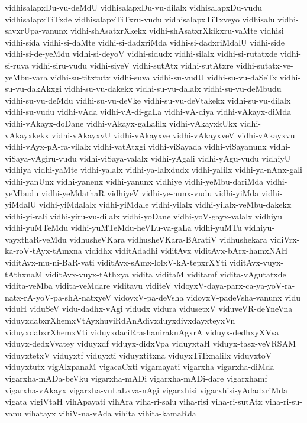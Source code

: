 {vidhisalapxDu-vu-deMdU
vidhisalapxDu-vu-dilalx
vidhisalapxDu-vudu
vidhisalapxTiTxde
vidhisalapxTiTxru-vudu
vidhisalapxTiTxveyo
vidhisalu
vidhi-savxrUpa-vanunx
vidhi-shAsatxrXkekx
vidhi-shAsatxrXkikxru-vaMte
vidhisi
vidhi-sida
vidhi-si-daMte
vidhi-si-dadxriMda
vidhi-si-dadxriMdalU
vidhi-side
vidhi-si-de-yeMdu
vidhi-si-deyoV
vidhi-sidudx
vidhi-silalx
vidhi-si-rutatxde
vidhi-si-ruva
vidhi-siru-vudu
vidhi-siyeV
vidhi-sutAtx
vidhi-sutAtxre
vidhi-sutatx-ve-yeMbu-vara
vidhi-su-titxtutx
vidhi-suva
vidhi-su-vudU
vidhi-su-vu-daSeTx
vidhi-su-vu-dakAkxgi
vidhi-su-vu-dakekx
vidhi-su-vu-dalalx
vidhi-su-vu-deMbudu
vidhi-su-vu-deMdu
vidhi-su-vu-deVke
vidhi-su-vu-deVtakekx
vidhi-su-vu-dilalx
vidhi-su-vudu
vidhi-vAda
vidhi-vA-di-gaLa
vidhi-vA-diya
vidhi-vAkayx-diMda
vidhi-vAkayx-doDane
vidhi-vAkayx-gaLalilx
vidhi-vAkayxkUkx
vidhi-vAkayxkekx
vidhi-vAkayxvU
vidhi-vAkayxve
vidhi-vAkayxveV
vidhi-vAkayxvu
vidhi-vAyx-pA-ra-vilalx
vidhi-vatAtxgi
vidhi-viSayada
vidhi-viSayanunx
vidhi-viSaya-vAgiru-vudu
vidhi-viSaya-valalx
vidhi-yAgali
vidhi-yAgu-vudu
vidhiyU
vidhiya
vidhi-yaMte
vidhi-yalalx
vidhi-ya-lalxdudx
vidhi-yalilx
vidhi-ya-nAnx-gali
vidhi-yanUnx
vidhi-yanenx
vidhi-yanunx
vidhiye
vidhi-yeMbu-dariMda
vidhi-yeMbudu
vidhi-yeMdathaR
vidhiyeV
vidhi-ye-nunx-vudu
vidhi-yiMda
vidhi-yiMdalU
vidhi-yiMdalalx
vidhi-yiMdale
vidhi-yilalx
vidhi-yilalx-veMbu-dakekx
vidhi-yi-rali
vidhi-yiru-vu-dilalx
vidhi-yoDane
vidhi-yoV-gayx-valalx
vidhiyu
vidhi-yuMTeMdu
vidhi-yuMTeMdu-heVLu-va-gaLa
vidhi-yuMTu
vidhiyu-vayxthaR-veMdu
vidhusheVKara
vidhusheVKara-BAratiV
vidhushekara
vidiVrx-ka-roV-tAyx-tAmxna
vididhx
viditAdadhi
viditAvx
viditAvx-bArx-hamxNAH
viditAvx-mu-ni-BaR-vati
viditAvx-sAmx-lolxV-kA-tepxrXYti
viditAvx-vuyx-tAthxnaM
viditAvx-vuyx-tAthxya
vidita
viditaM
viditamf
vidita-vAgutatxde
vidita-veMba
vidita-veMdare
viditavu
viditeV
vidoyxV-daya-parx-ca-ya-yoV-ra-natx-rA-yoV-pa-shA-natxyeV
vidoyxV-pa-deVsha
vidoyxV-padeVsha-vanunx
vidu
viduH
viduSeV
vidu-dadhx-vAgi
vidudx
vidura
vidusetxV
viduveVR-deYneVna
viduyxdabxrXhemxVtAyxhuviRdAnAdivxduyxdivxdayxteyxVn
viduyxdabxrXhemxVti
viduyxdaciRrashaniraknAgxrA
viduyx-dedhxyXVva
viduyx-dedxVvatey
viduyxdf
viduyx-didxVpa
viduyxtaH
viduyx-tasx-veVRSAM
viduyxtetxV
viduyxtf
viduyxti
viduyxtitxna
viduyxTiTxnalilx
viduyxtoV
viduyxtutx
vigAlxpanaM
vigacaCxti
vigamayati
vigarxha
vigarxha-diMda
vigarxha-mADa-beVku
vigarxha-mADi
vigarxha-mADi-dare
vigarxhamf
vigarxha-vAkayx
vigarxha-vuLaLxva-nAgi
vigarxhisi
vigarxhisi-yAdadxriMda
vigata
vigiVtaH
vihApayati
vihAra
viha-ri-salu
viha-risi
viha-ri-sutAtx
viha-ri-su-vanu
vihatayx
vihiV-na-vAda
vihita
vihita-kamaRda
}
